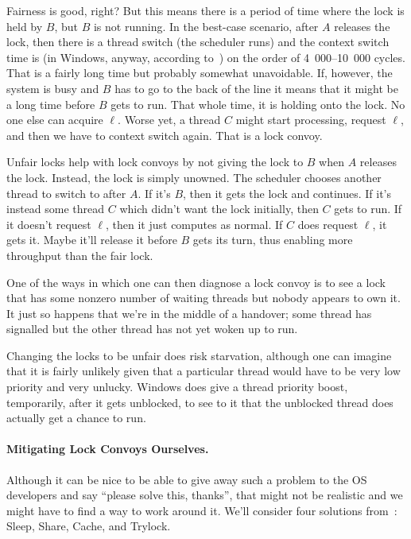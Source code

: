 Fairness is good, right? But this means there is a period of time where the lock is held by $B$, but $B$ is not running. In the best-case scenario, after $A$ releases the lock, then there is a thread switch (the scheduler runs) and the context switch time is (in Windows, anyway, according to~\cite{anticonvoy}) on the order of 4~000--10~000 cycles. That is a fairly long time but probably somewhat unavoidable. If, however, the system is busy and $B$ has to go to the back of the line it means that it might be a long time before $B$ gets to run. That whole time, it is holding onto the lock. No one else can acquire $\ell$. Worse yet, a thread $C$ might start processing, request $\ell$, and then we have to context switch again. That is a lock convoy.

Unfair locks help with lock convoys by not giving the lock to $B$ when $A$ releases the lock. Instead, the lock is simply unowned. The scheduler chooses another thread to switch to after $A$. If it's $B$, then it gets the lock and continues. If it's instead some thread $C$ which didn't want the lock initially, then $C$ gets to run. If it doesn't request $\ell$, then it just computes as normal. If $C$ does request $\ell$, it gets it. Maybe it'll release it before $B$ gets its turn, thus enabling more throughput than the fair lock.

One of the ways in which one can then diagnose a lock convoy is to see a lock that has some nonzero number of waiting threads but nobody appears to own it. It just so happens that we're in the middle of a handover; some thread has signalled but the other thread has not yet woken up to run.

Changing the locks to be unfair does risk starvation, although one can imagine that it is fairly unlikely given that a particular thread would have to be very low priority and very unlucky. Windows does give a thread priority boost, temporarily, after it gets unblocked, to see to it that the unblocked thread does actually get a chance to run.

\paragraph{Mitigating Lock Convoys Ourselves.} Although it can be nice to be able to give away such a problem to the OS developers and say ``please solve this, thanks'', that might not be realistic and we might have to find a way to work around it. We'll consider four solutions from~\cite{lockconvoys}: Sleep, Share, Cache, and Trylock.

